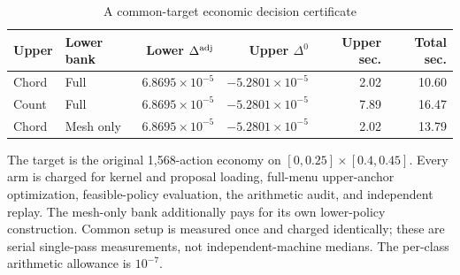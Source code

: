 \begin{table}[htbp]
\centering
\caption{A common-target economic decision certificate}\label{tab:r8_contest}
\small
\begin{tabular}{llrrrr}
\toprule
Upper & Lower bank & Lower $\Delta^{\rm adj}$ & Upper $\Delta^0$ & Upper sec. & Total sec. \\
\midrule
Chord & Full & $6.8695\times10^{-5}$ & $-5.2801\times10^{-5}$ & 2.02 & 10.60 \\
Count & Full & $6.8695\times10^{-5}$ & $-5.2801\times10^{-5}$ & 7.89 & 16.47 \\
Chord & Mesh only & $6.8695\times10^{-5}$ & $-5.2801\times10^{-5}$ & 2.02 & 13.79 \\
\bottomrule
\end{tabular}
\par\vspace{3pt}\begin{minipage}{0.96\textwidth}\footnotesize The target is the original 1,568-action economy on $[0,0.25]\times[0.4,0.45]$. Every arm is charged for kernel and proposal loading, full-menu upper-anchor optimization, feasible-policy evaluation, the arithmetic audit, and independent replay. The mesh-only bank additionally pays for its own lower-policy construction. Common setup is measured once and charged identically; these are serial single-pass measurements, not independent-machine medians. The per-class arithmetic allowance is $10^{-7}$.\end{minipage}
\end{table}
